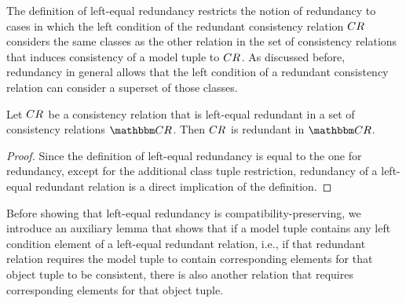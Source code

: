 
The definition of left-equal redundancy restricts the notion of redundancy to cases in which the left condition of the redundant consistency relation $\consistencyrelation{CR}{}$ considers the same classes as the other relation in the set of consistency relations that induces consistency of a model tuple to $\consistencyrelation{CR}{}$.
As discussed before, redundancy in general allows that the left condition of a redundant consistency relation can consider a superset of those classes. %

\begin{lemma} \label{lemma:leftequalredundancyimpliesredundancy}
    Let $\consistencyrelation{CR}{}$ be a consistency relation that is left-equal redundant in a set of consistency relations $\consistencyrelationset{CR}$. Then $\consistencyrelation{CR}{}$ is redundant in $\consistencyrelationset{CR}$.
\end{lemma}
\begin{proof}
    Since the definition of left-equal redundancy is equal to the one for redundancy, except for the additional class tuple restriction, redundancy of a left-equal redundant relation is a direct implication of the definition.
\end{proof}

Before showing that left-equal redundancy is compatibility-preserving, we introduce an auxiliary lemma that shows that if a model tuple contains any left condition element of a left-equal redundant relation, i.e., if that redundant relation requires the model tuple to contain corresponding elements for that object tuple to be consistent, there is also another relation that requires corresponding elements for that object tuple.

